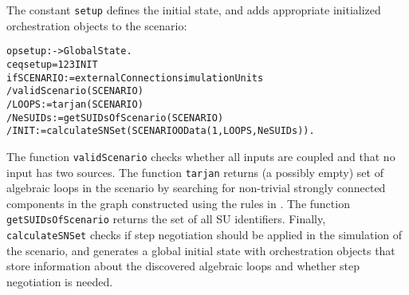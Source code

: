 The constant \texttt{setup} defines the initial state, and adds
appropriate initialized orchestration objects to the scenario:

\small
\begin{alltt}
op setup : -> GlobalState .
ceq setup = \char123INIT
  if SCENARIO := externalConnection simulationUnits
  / validScenario(SCENARIO)
  / LOOPS := tarjan(SCENARIO)
  / NeSUIDs := getSUIDsOfScenario(SCENARIO)
  / INIT := calculateSNSet(SCENARIO OData(1,LOOPS, NeSUIDs)) .
\end{alltt}
\normalsize

\noindent The function \texttt{validScenario} checks whether all inputs are coupled and that no input has two sources.   
The function \texttt{tarjan} returns (a possibly empty) set  of algebraic loops in the scenario by searching for non-trivial strongly connected components in
the graph constructed using the rules  in \cite{Gomes2019c}.   
The function \texttt{getSUIDsOfScenario} returns  the set of all SU
identifiers. Finally, \texttt{calculateSNSet} checks if step negotiation 
should be applied in the simulation of the scenario, and generates a
global initial state with orchestration objects that store information
about the discovered algebraic loops and whether step negotiation is
needed.